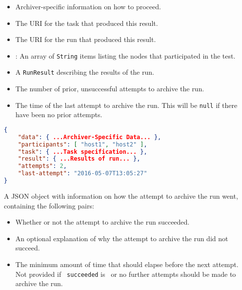\documentclass[10pt,titlepage]{article}
\begin{document}
\begin{itemize}
\item {} Archiver-specific information on how to proceed.

\item {} The URI for the task that produced
  this result.

\item {} The URI for the run that produced
  this result.

\item{}: An array of {\tt String} items
  listing the nodes that participated in the test.

\item {} A {\tt RunResult} describing
  the results of the run.

\item {} The number of prior, unsuccessful
  attempts to archive the run.

\item {} The time of the last attempt
  to archive the run.  This will be {\tt null} if there have been no
  prior attempts.
\end{itemize}

\example
\begin{lstlisting}[language=json,firstnumber=1]
{
    "data": { ...Archiver-Specific Data... },
    "participants": [ "host1", "host2" ],
    "task": { ...Task specification... },
    "result": { ...Results of run... },
    "attempts": 2,
    "last-attempt": "2016-05-07T13:05:27"
}
\end{lstlisting}


 A JSON object with information on how
the attempt to archive the run went, containing the following pairs:

\begin{itemize}
\item {} Whether or not the attempt to archive
the run succeeded.
\item {} An optional explanation of why the
  attempt to archive the run did not succeed.
\item {} The minimum amount of time that
  should elapse before the next attempt.  Not provided if {\tt
    succeeded} is \true\  or no further attempts should be made to
  archive the run.
\end{itemize}
\end{document}
